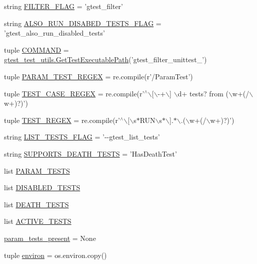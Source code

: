 \begin{DoxyCompactItemize}
string \hyperlink{namespacegtest__filter__unittest_a4e1a92405aa6d661157f2f8498692796}{\-F\-I\-L\-T\-E\-R\-\_\-\-F\-L\-A\-G} = 'gtest\-\_\-filter'
\item 
string \hyperlink{namespacegtest__filter__unittest_a1faae9d17ac3e4505c49004bd8c29ace}{\-A\-L\-S\-O\-\_\-\-R\-U\-N\-\_\-\-D\-I\-S\-A\-B\-E\-D\-\_\-\-T\-E\-S\-T\-S\-\_\-\-F\-L\-A\-G} = 'gtest\-\_\-also\-\_\-run\-\_\-disabled\-\_\-tests'
\item 
tuple \hyperlink{namespacegtest__filter__unittest_add010199942a26d17bd560c1ce462eeb}{\-C\-O\-M\-M\-A\-N\-D} = \hyperlink{namespacegtest__test__utils_a1bdf3cac86afa675ed37629b183048e9}{gtest\-\_\-test\-\_\-utils.\-Get\-Test\-Executable\-Path}('gtest\-\_\-filter\-\_\-unittest\-\_\-')
\item 
tuple \hyperlink{namespacegtest__filter__unittest_a7fe91f4f3bcf106f17e0d1f1774b6ae3}{\-P\-A\-R\-A\-M\-\_\-\-T\-E\-S\-T\-\_\-\-R\-E\-G\-E\-X} = re.\-compile(r'/\-Param\-Test')
\item 
tuple \hyperlink{namespacegtest__filter__unittest_a4330f7f7cad334d88b3407948ff564a8}{\-T\-E\-S\-T\-\_\-\-C\-A\-S\-E\-\_\-\-R\-E\-G\-E\-X} = re.\-compile(r'$^\wedge$$\backslash$\mbox{[}$\backslash$-\/+$\backslash$\mbox{]} $\backslash$d+ tests? from ($\backslash$w+(/$\backslash$w+)?)')
\item 
tuple \hyperlink{namespacegtest__filter__unittest_a293d86c2c782e2c06c8c9368763ef189}{\-T\-E\-S\-T\-\_\-\-R\-E\-G\-E\-X} = re.\-compile(r'$^\wedge$$\backslash$\mbox{[}$\backslash$s$\ast$\-R\-U\-N$\backslash$s$\ast$$\backslash$\mbox{]}.$\ast$$\backslash$.($\backslash$w+(/$\backslash$w+)?)')
\item 
string \hyperlink{namespacegtest__filter__unittest_a6bd797257f4db78c152b6e62341177db}{\-L\-I\-S\-T\-\_\-\-T\-E\-S\-T\-S\-\_\-\-F\-L\-A\-G} = '-\/-\/gtest\-\_\-list\-\_\-tests'
\item 
string \hyperlink{namespacegtest__filter__unittest_ab164861804ce21115e617dfbe5788ad4}{\-S\-U\-P\-P\-O\-R\-T\-S\-\_\-\-D\-E\-A\-T\-H\-\_\-\-T\-E\-S\-T\-S} = '\-Has\-Death\-Test'
\item 
list \hyperlink{namespacegtest__filter__unittest_a32e8a5c72ae50f55ab9fb6ef2037638c}{\-P\-A\-R\-A\-M\-\_\-\-T\-E\-S\-T\-S}
\item 
list \hyperlink{namespacegtest__filter__unittest_ac22e00ec6657e8cf7ceaf3f4dcf5c483}{\-D\-I\-S\-A\-B\-L\-E\-D\-\_\-\-T\-E\-S\-T\-S}
\item 
list \hyperlink{namespacegtest__filter__unittest_aface76eca4f60b7f322f330f1c53dec0}{\-D\-E\-A\-T\-H\-\_\-\-T\-E\-S\-T\-S}
\item 
list \hyperlink{namespacegtest__filter__unittest_a10a0fc6f90e8342edb66ea225cee9164}{\-A\-C\-T\-I\-V\-E\-\_\-\-T\-E\-S\-T\-S}
\item 
\hyperlink{namespacegtest__filter__unittest_a1d6ab553380c1113d7ea8bcfd6b273b4}{param\-\_\-tests\-\_\-present} = \-None
\item 
tuple \hyperlink{namespacegtest__filter__unittest_a199b463c0623b1b68e7b45e7b01fe16c}{environ} = os.\-environ.\-copy()
\end{DoxyCompactItemize}



